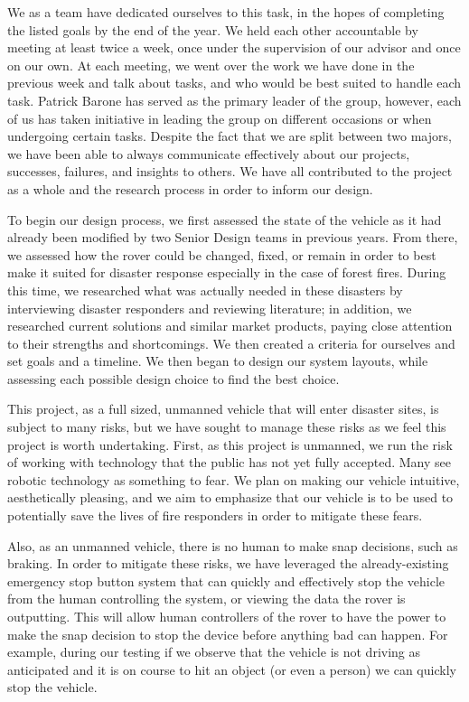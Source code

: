 We as a team have dedicated ourselves to this task, in the hopes of completing the listed goals by the end of the year. We held each other accountable by meeting at least twice a week, once under the supervision of our advisor and once on our own. At each meeting, we went over the work we have done in the previous week and talk about tasks, and who would be best suited to handle each task. Patrick Barone has served as the primary leader of the group, however, each of us has taken initiative in leading the group on different occasions or when undergoing certain tasks. Despite the fact that we are split between two majors, we have been able to always communicate effectively about our projects, successes, failures, and insights to others. We have all contributed to the project as a whole and the research process in order to inform our design. 

To begin our design process, we first assessed the state of the vehicle as it had already been modified by two Senior Design teams in previous years. From there, we assessed how the rover could be changed, fixed, or remain in order to best make it suited for disaster response especially in the case of forest fires. During this time, we researched what was actually needed in these disasters by interviewing disaster responders and reviewing literature; in addition, we researched current solutions and similar market products, paying close attention to their strengths and shortcomings. We then created a criteria for ourselves and set goals and a timeline. We then began to design our system layouts, while assessing each possible design choice to find the best choice. 

This project, as a full sized, unmanned vehicle that will enter disaster sites, is subject to many risks, but we have sought to manage these risks as we feel this project is worth undertaking. First, as this project is unmanned, we run the risk of working with technology that the public has not yet fully accepted. Many see robotic technology as something to fear. We plan on making our vehicle intuitive, aesthetically pleasing, and we aim to emphasize that our vehicle is to be used to potentially save the lives of fire responders in order to mitigate these fears. 

Also, as an unmanned vehicle, there is no human to make snap decisions, such as braking. In order to mitigate these risks, we have leveraged the already-existing emergency stop button system that can quickly and effectively stop the vehicle from the human controlling the system, or viewing the data the rover is outputting. This will allow human controllers of the rover to have the power to make the snap decision to stop the device before anything bad can happen. For example, during our testing if we observe that the vehicle is not driving as anticipated and it is on course to hit an object (or even a person) we can quickly stop the vehicle.

